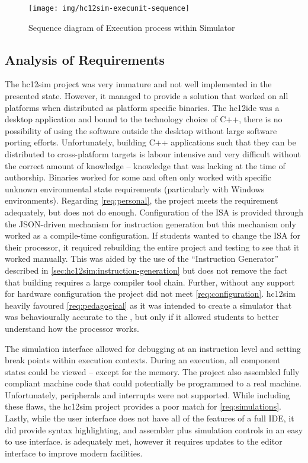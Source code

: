 \begin{figure}[!ph]
    \centering
    \texttt{[image: img/hc12sim-execunit-sequence]}
    \caption{Sequence diagram of Execution process within Simulator}
    \label{fig:hc12sim-execunit-sequence}
\end{figure} 

\subsection*{Analysis of Requirements}
\label{sec:review-prev-hc12sim}

The hc12sim project was very immature and not well implemented in the presented state. However, it managed to provide a solution that worked on all platforms when distributed as platform specific binaries. The hc12ide was a desktop application and bound to the technology choice of C++, there is no possibility of using the software outside the desktop without large software porting efforts. Unfortunately, building C++ applications such that they can be distributed to cross-platform targets is labour intensive and very difficult without the correct amount of knowledge -- knowledge that was lacking at the time of authorship. Binaries worked for some and often only worked with specific unknown environmental state requirements (particularly with Windows environments). Regarding \cref{req:personal}, the project meets the requirement adequately, but does not do enough. Configuration of the ISA is provided through the JSON-driven mechanism for instruction generation but this mechanism only worked as a compile-time configuration. If students wanted to change the ISA for their processor, it required rebuilding the entire project and testing to see that it worked manually. This was aided by the use of the ``Instruction Generator'' described in \cref{sec:hc12sim:instruction-generation} but does not remove the fact that building requires a large compiler tool chain. Further, without any support for hardware configuration the project did not meet \cref{req:configuration}. hc12sim heavily favoured \cref{req:pedagogical} as it was intended to create a simulator that was behaviourally accurate to the \hcmodel, but only if it allowed students to better understand how the processor works.

The simulation interface allowed for debugging at an instruction level and setting break points within execution contexts. During an execution, all component states could be viewed -- except for the memory. The project also assembled fully compliant machine code that could potentially be programmed to a real machine. Unfortunately, peripherals and interrupts were not supported. While including these flaws, the hc12sim project provides a poor match for \cref{req:simulations}. Lastly, while the user interface does not have all of the features of a full IDE, it did provide syntax highlighting, and assembler plus simulation controls in an easy to use interface.  is adequately met, however it requires updates to the editor interface to improve modern facilities.

